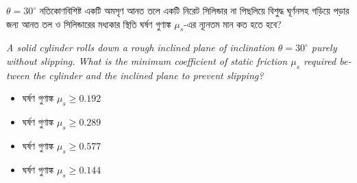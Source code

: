 \documentclass[12pt, a4paper]{article}
\begin{document}
\newpage

\begin{tcolorbox}[questionbox={প্রশ্ন (Question) 49}]
    \noindent
    $\theta = 30^\circ$ নতিকোণবিশিষ্ট একটি অমসৃণ আনত তলে একটি নিরেট সিলিন্ডার না পিছলিয়ে বিশুদ্ধ ঘূর্ণনসহ গড়িয়ে পড়ার জন্য আনত তল ও সিলিন্ডারের মধ্যকার স্থিতি ঘর্ষণ গুণাঙ্ক $\mu_s$-এর ন্যূনতম মান কত হতে হবে?
    
    \vspace{0.8em}
    \begin{english}
    \noindent\textit{\color{darkgray}
    A solid cylinder rolls down a rough inclined plane of inclination $\theta = 30^\circ$ purely without slipping. What is the minimum coefficient of static friction $\mu_s$ required between the cylinder and the inclined plane to prevent slipping?
    }
    \end{english}
\end{tcolorbox}

\vspace{1em}
\begin{center}
\end{center}
\vspace{1em}

\begin{itemize}[label={}, leftmargin=1cm, itemsep=0.5em]
    \item[\textbf{A)}] ঘর্ষণ গুণাঙ্ক $\mu_s \ge 0.192$
    \item[\textbf{B)}] ঘর্ষণ গুণাঙ্ক $\mu_s \ge 0.289$
    \item[\textbf{C)}] ঘর্ষণ গুণাঙ্ক $\mu_s \ge 0.577$
    \item[\textbf{D)}] ঘর্ষণ গুণাঙ্ক $\mu_s \ge 0.144$
\end{itemize}
\end{document}

